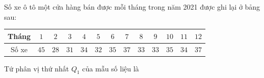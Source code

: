 \begin{ex}
Số xe ô tô một cửa hàng bán được mỗi tháng trong năm 2021 được ghi lại ở bảng sau:
\begin{center}
\begin{tabular}{|c|c|c|c|c|c|c|c|c|c|c|c|c|}\hline
Tháng & $1$ & $2$ & $3$ & $4$ & $5$ & $6$ & $7$ & $8$ & $9$ & $10$ & $11$ & $12$\\\hline
Số xe & $45$ & $28$ & $31$ & $34$ & $32$ & $35$ & $37$ & $33$ & $33$ & $35$ & $34$ & $37$\\\hline
\end{tabular}
\end{center}
Tứ phân vị thứ nhất $Q_1$ của mẫu số liệu là
\end{ex}
